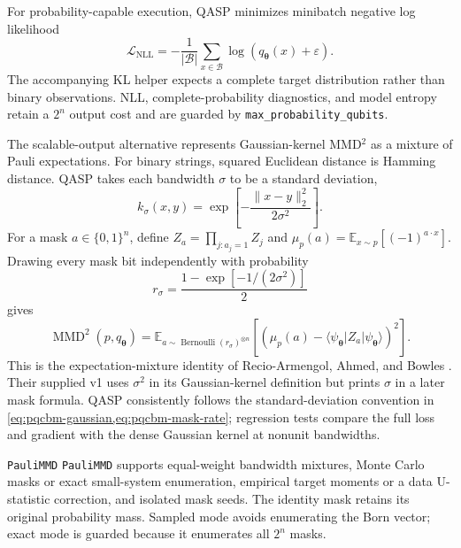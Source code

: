 \documentclass[10pt]{article}
\newcommand{\code}[1]{\texttt{#1}}
\newcommand{\E}{\mathbb{E}}
\begin{document}
For probability-capable execution, QASP minimizes minibatch negative log
likelihood
\begin{equation}
  \mathcal{L}_{\mathrm{NLL}}
  =-\frac{1}{|\mathcal{B}|}\sum_{x\in\mathcal{B}}
    \log\!\left(q_{\bm{\theta}}(x)+\varepsilon\right).
  \label{eq:pqcbm-nll}
\end{equation}
The accompanying KL helper expects a complete target distribution rather than
binary observations.  NLL, complete-probability diagnostics, and model entropy
retain a $2^n$ output cost and are guarded by
\code{max\_probability\_qubits}.

The scalable-output alternative represents Gaussian-kernel MMD$^2$ as a
mixture of Pauli expectations.  For binary strings, squared Euclidean distance
is Hamming distance.  QASP takes each bandwidth $\sigma$ to be a standard
deviation,
\begin{equation}
  k_\sigma(x,y)
  =\exp\!\left[-\frac{\|x-y\|_2^2}{2\sigma^2}\right].
  \label{eq:pqcbm-gaussian}
\end{equation}
For a mask $a\in\{0,1\}^n$, define
$Z_a=\prod_{j:a_j=1}Z_j$ and
$\mu_p(a)=\E_{x\sim p}[(-1)^{a\cdot x}]$.  Drawing every mask bit
independently with probability
\begin{equation}
  r_\sigma=\frac{1-\exp[-1/(2\sigma^2)]}{2}
  \label{eq:pqcbm-mask-rate}
\end{equation}
gives
\begin{equation}
  \operatorname{MMD}^2(p,q_{\bm\theta})
  =\E_{a\sim\operatorname{Bernoulli}(r_\sigma)^{\otimes n}}
  \left[
    \left(\mu_p(a)-\langle\psi_{\bm\theta}|Z_a|
    \psi_{\bm\theta}\rangle\right)^2
  \right].
  \label{eq:pqcbm-pauli-mmd}
\end{equation}
This is the expectation-mixture identity of
Recio-Armengol, Ahmed, and Bowles \cite{recioarmengol2025train}.  Their supplied
v1 uses $\sigma^2$ in its Gaussian-kernel definition but prints $\sigma$ in a
later mask formula.  QASP consistently follows the standard-deviation
convention in \cref{eq:pqcbm-gaussian,eq:pqcbm-mask-rate}; regression tests
compare the full loss and gradient with the dense Gaussian kernel at nonunit
bandwidths.

\begin{qaspfeature}{\code{PauliMMD}}
\code{PauliMMD} supports equal-weight bandwidth mixtures, Monte Carlo masks or
exact small-system enumeration, empirical target moments or a data
U-statistic correction, and isolated mask seeds.  The identity mask retains
its original probability mass.  Sampled mode avoids enumerating the Born
vector; exact mode is guarded because it enumerates all $2^n$ masks.
\end{qaspfeature}
\end{document}
